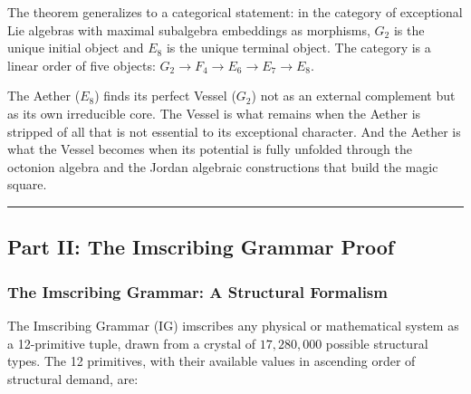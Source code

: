\documentclass[12pt,a4paper]{article}
\begin{document}
The theorem generalizes to a categorical statement: in the category of exceptional Lie algebras with maximal subalgebra embeddings as morphisms, $G_2$ is the unique initial object and $E_8$ is the unique terminal object. The category is a linear order of five objects: $G_2 \to F_4 \to E_6 \to E_7 \to E_8$.

The Aether ($E_8$) finds its perfect Vessel ($G_2$) not as an external complement but as its own irreducible core. The Vessel is what remains when the Aether is stripped of all that is not essential to its exceptional character. And the Aether is what the Vessel becomes when its potential is fully unfolded through the octonion algebra and the Jordan algebraic constructions that build the magic square.

\begin{center}
\rule{0.5\textwidth}{0.4pt}
\end{center}

\subsection{Part II: The Imscribing Grammar Proof}

\subsubsection{The Imscribing Grammar: A Structural Formalism}

The Imscribing Grammar (IG) imscribes any physical or mathematical system as a 12-primitive tuple, drawn from a crystal of $17{,}280{,}000$ possible structural types. The 12 primitives, with their available values in ascending order of structural demand, are:
\end{document}
